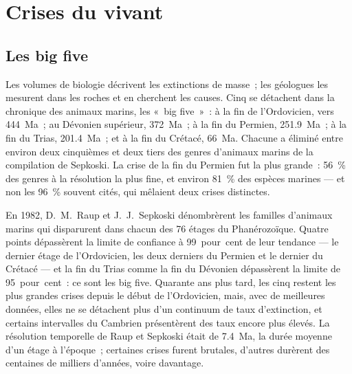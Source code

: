 \section{Crises du vivant}\label{sec:b2:phanerozoic-earth:extinctions}

\subsection*{Les big five}

Les volumes de biologie décrivent les extinctions de masse~; les géologues les mesurent dans les
roches et en cherchent les causes. Cinq se détachent dans la chronique des animaux marins, les
«~big five~»~: à la fin de l'Ordovicien, vers \qty{444}{Ma}~; au Dévonien supérieur, \qty{372}{Ma}~;
à la fin du Permien, \qty{251.9}{Ma}~; à la fin du Trias, \qty{201.4}{Ma}~; et à la fin du
Crétacé, \qty{66}{Ma}. Chacune a éliminé entre environ deux cinquièmes et deux tiers des genres
d'animaux marins de la compilation de Sepkoski. La crise de la fin du Permien fut la plus grande~:
\qty{56}{\percent} des genres à la résolution la plus fine, et environ \qty{81}{\percent} des espèces
marines --- et non les \qty{96}{\percent} souvent cités, qui mêlaient deux crises distinctes.

\begin{history}
En 1982, D.~M.~Raup et J.~J.~Sepkoski dénombrèrent les familles d'animaux marins qui disparurent dans
chacun des 76 étages du Phanérozoïque. Quatre points dépassèrent la limite de confiance à 99~pour~cent
de leur tendance --- le dernier étage de l'Ordovicien, les deux derniers du Permien et le dernier du
Crétacé --- et la fin du Trias comme la fin du Dévonien dépassèrent la limite de 95~pour~cent~: ce
sont les big five. Quarante ans plus tard, les cinq restent les plus grandes crises depuis le début de
l'Ordovicien, mais, avec de meilleures données, elles ne se détachent plus d'un continuum de taux
d'extinction, et certains intervalles du Cambrien présentèrent des taux encore plus élevés. La résolution
temporelle de Raup et Sepkoski était de \qty{7.4}{Ma}, la durée moyenne d'un étage à l'époque~;
certaines crises furent brutales, d'autres durèrent des centaines de milliers d'années, voire davantage.
\end{history}

